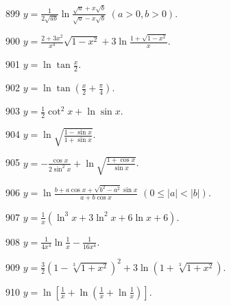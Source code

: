 \begin{prob}[S]{899}
$y = \frac{1}{2\sqrt{ab}}\ln\frac{\sqrt{a} + x\sqrt{b}}{\sqrt{a} - x\sqrt{b}}$ $(a > 0, b > 0)$.
\end{prob}

\begin{prob}[S]{900}
$y = \frac{2 + 3x^2}{x^4}\sqrt{1 - x^2} + 3\ln\frac{1 + \sqrt{1 - x^2}}{x}$.
\end{prob}

\begin{prob}[S]{901}
$y = \ln\tan\frac{x}{2}$.
\end{prob}

\begin{prob}[S]{902}
$y = \ln\tan\left(\frac{x}{2} + \frac{\pi}{4}\right)$.
\end{prob}

\begin{prob}[S]{903}
$y = \frac{1}{2}\cot^2 x + \ln\sin x$.
\end{prob}

\begin{prob}[S]{904}
$y = \ln\sqrt{\frac{1 - \sin x}{1 + \sin x}}$.
\end{prob}

\begin{prob}[S]{905}
$y = -\frac{\cos x}{2\sin^2 x} + \ln\sqrt{\frac{1 + \cos x}{\sin x}}$.
\end{prob}

\begin{prob}[S]{906}
$y = \ln\frac{b + a\cos x + \sqrt{b^2 - a^2}\sin x}{a + b\cos x}$ $(0 \leqslant |a| < |b|)$.
\end{prob}

\begin{prob}[S]{907}
$y = \frac{1}{x}(\ln^3 x + 3\ln^2 x + 6\ln x + 6)$.
\end{prob}

\begin{prob}[S]{908}
$y = \frac{1}{4x^4}\ln\frac{1}{x} - \frac{1}{16x^4}$.
\end{prob}

\begin{prob}[S]{909}
$y = \frac{3}{2}\left(1 - \sqrt[3]{1 + x^2}\right)^2 + 3\ln\left(1 + \sqrt[3]{1 + x^2}\right)$.
\end{prob}

\begin{prob}[S]{910}
$y = \ln\left[\frac{1}{x} + \ln\left(\frac{1}{x} + \ln\frac{1}{x}\right)\right]$.
\end{prob}

